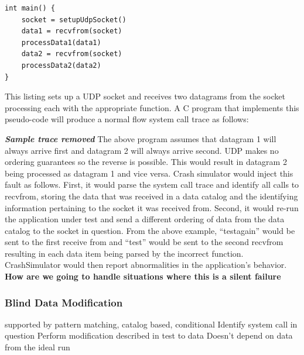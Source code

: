             \begin{verbatim}
int main() {
    socket = setupUdpSocket()
    data1 = recvfrom(socket)
    processData1(data1)
    data2 = recvfrom(socket)
    processData2(data2)
}
            \end{verbatim}

            This listing sets up a UDP socket and receives two datagrams from the socket processing each with the
            appropriate function. A C program that implements this pseudo-code will produce a normal flow system call trace
            as follows:

            \textbf{\emph{Sample trace removed}}
            The above program assumes that datagram 1 will always arrive first and datagram 2 will always arrive second. UDP
            makes no ordering guarantees so the reverse is possible. This would result in datagram 2 being processed as
            datagram 1 and vice versa. Crash simulator would inject this fault as follows. First, it would parse the system
            call trace and identify all calls to recvfrom, storing the data that was received in a data catalog and the
            identifying information pertaining to the socket it was received from. Second, it would re-run the application
            under test and send a different ordering of data from the data catalog to the socket in question. From the above
            example, ``testagain'' would be sent to the first receive from and ``test'' would be sent to the second recvfrom
            resulting in each data item being parsed by the incorrect function. CrashSimulator would then report
            abnormalities in the application's behavior. \textbf{How are we going to handle situations where this is a
            silent failure}

        \subsubsection{Blind Data Modification}

            supported by pattern matching, catalog based, conditional
            Identify system call in question
            Perform modification described in test to data
            Doesn't depend on data from the ideal run
